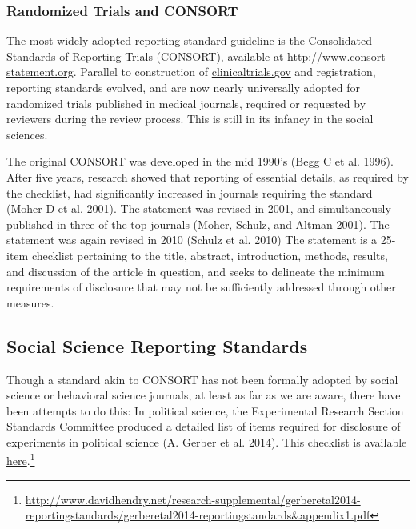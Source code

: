 \documentclass[12pt] {article}
\begin{document}

\subsubsection{Randomized Trials and CONSORT}\label{randomized-trials}
The most widely adopted reporting standard guideline is the Consolidated Standards of Reporting Trials (CONSORT), available at \url{http://www.consort-statement.org}. Parallel to construction of \href{http://clinicaltrials.gov}{clinicaltrials.gov} and registration,
reporting standards evolved, and are now nearly universally adopted for randomized trials published in medical journals, required or requested by reviewers during the review process. This is still in its infancy in the social sciences.

The original CONSORT  was developed in the mid 1990's (Begg C et al. 1996). After five years, research showed that reporting of essential details, as required by the checklist, had significantly increased in journals requiring the standard  (Moher D et al. 2001). The statement was revised in 2001, and simultaneously published in three of the top journals (Moher, Schulz, and Altman 2001). The statement was again revised in 2010 (Schulz et al. 2010) The statement is a 25-item checklist pertaining to the title, abstract, introduction, methods, results, and discussion of the article in question, and seeks to delineate the minimum requirements of disclosure that may not be sufficiently addressed through other measures.

\subsection{Social Science Reporting Standards}\label{soc-sci-standards}
Though a standard akin to CONSORT has not been formally adopted by social science or behavioral science journals, at least as far as we are aware, there have been attempts to do this: In political science, the Experimental Research Section Standards Committee produced a detailed list of items required for disclosure of experiments in political science (A. Gerber et al. 2014). This checklist is available \href{http://www.davidhendry.net/research-supplemental/gerberetal2014-reportingstandards/gerberetal2014-reportingstandards&appendix1.pdf}{here}.\footnote{\url{http://www.davidhendry.net/research-supplemental/gerberetal2014-reportingstandards/gerberetal2014-reportingstandards&appendix1.pdf}}
\end{document}

